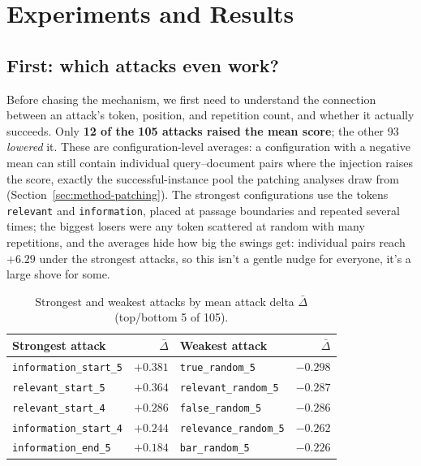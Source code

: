 \documentclass[11pt]{article}
\begin{document}
\section{Experiments and Results}
\label{sec:results}

\subsection{First: which attacks even work?}
\label{sec:results-strength}

Before chasing the mechanism, we first need to understand the connection
between an attack's token, position, and repetition count, and whether it
actually succeeds. Only \textbf{12 of the 105 attacks raised the mean score};
the other 93 \emph{lowered} it. These are configuration-level averages: a
configuration with a negative mean can still contain individual
query--document pairs where the injection raises the score, exactly the
successful-instance pool the patching analyses draw from
(Section~\ref{sec:method-patching}). The strongest configurations use the
tokens \texttt{relevant} and \texttt{information}, placed at passage
boundaries and repeated several times; the biggest losers were any token
scattered at random with many repetitions, and the averages hide how big
the swings get: individual pairs reach $+6.29$ under the strongest
attacks, so this isn't a gentle nudge for everyone, it's a large shove
for some.

\begin{table}[h]
\centering
\caption{Strongest and weakest attacks by mean attack delta $\bar\Delta$
(top/bottom 5 of 105).}
\label{tab:topbottom}
\small
\begin{tabular}{lr|lr}
\toprule
Strongest attack & $\bar\Delta$ & Weakest attack & $\bar\Delta$ \\
\midrule
\texttt{information\_start\_5} & $+0.381$ & \texttt{true\_random\_5}      & $-0.298$ \\
\texttt{relevant\_start\_5}    & $+0.364$ & \texttt{relevant\_random\_5}  & $-0.287$ \\
\texttt{relevant\_start\_4}    & $+0.286$ & \texttt{false\_random\_5}     & $-0.286$ \\
\texttt{information\_start\_4} & $+0.244$ & \texttt{relevance\_random\_5} & $-0.262$ \\
\texttt{information\_end\_5}   & $+0.184$ & \texttt{bar\_random\_5}       & $-0.226$ \\
\bottomrule
\end{tabular}
\end{table}
\end{document}
